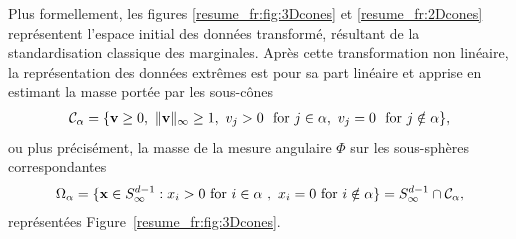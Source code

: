 Plus formellement, les figures \ref{resume_fr:fig:3Dcones} et \ref{resume_fr:2Dcones} représentent l'espace initial des données transformé, résultant de la standardisation classique des marginales. Après cette transformation non linéaire, la représentation des données extrêmes est pour sa part linéaire et apprise en estimant la masse portée par les sous-cônes
%
\begin{align*}
 \mathcal{C}_\alpha = \{\mathbf v \ge 0,~\|\mathbf v\|_\infty \ge 1,~ v_j > 0 ~\text{ for } j \in \alpha,~ v_j = 0 ~\text{ for } j \notin \alpha \},
\end{align*}
ou plus précisément, la masse de la mesure angulaire $\Phi$ sur les sous-sphères correspondantes
\begin{align*}
\Omega_{\alpha}  = \{\mathbf x \in S_{\infty}^{d-1} :  x_i > 0 \text{ for } i\in\alpha~,~  x_i = 0 \text{ for } i\notin \alpha   \} 
 = S_{\infty}^{d-1}\cap {\mathcal{C}}_\alpha,
\end{align*}
représentées Figure~\ref{resume_fr:fig:3Dcones}.

